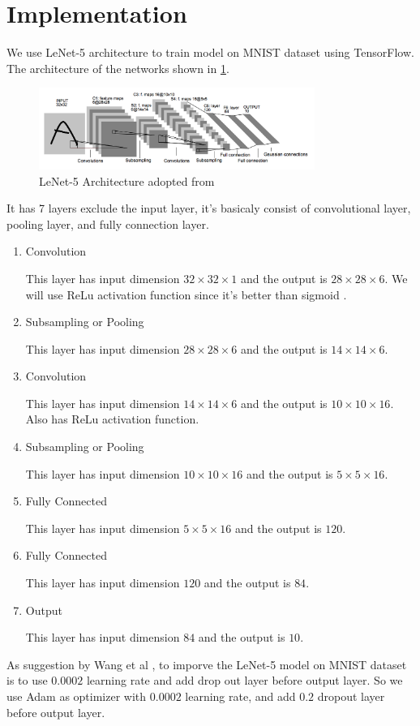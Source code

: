 \documentclass[conference]{IEEEtran}
\begin{document}
\section{Implementation}
We use LeNet-5 architecture to train model on MNIST dataset using TensorFlow. The architecture of the networks shown in \ref{fig:lenet-5archi}.
\begin{figure}[htbp]
    \centerline{\includegraphics[width=9cm]{LeNet-5Architecture.png}}
    \caption{LeNet-5 Architecture adopted from \protect\cite{lenet-5} }
    \label{fig:lenet-5archi}
\end{figure}
It has 7 layers exclude the input layer, it's basicaly consist of convolutional layer, pooling layer, and fully connection layer.
\begin{enumerate}
    \item Convolution

    This layer has input dimension $32 \times 32 \times 1$ and the output is $28 \times 28 \times 6$.
    We will use ReLu activation function since it's better than sigmoid \cite{wang2020improvement}.

    \item Subsampling or Pooling 
    
    This layer has input dimension $28 \times 28 \times 6$ and the output is $14 \times 14 \times 6$.

    \item Convolution
    
    This layer has input dimension $14 \times 14 \times 6$ and the output is $10 \times 10 \times 16$. Also has ReLu activation function.

    \item Subsampling or Pooling 
    
    This layer has input dimension $10 \times 10 \times 16$ and the output is $5 \times 5 \times 16$.

    \item Fully Connected
    
    This layer has input dimension $5 \times 5 \times 16$ and the output is $120$.

    \item Fully Connected
    
    This layer has input dimension $120$ and the output is $84$.

    \item Output  
    
    This layer has input dimension $84$ and the output is $10$.

\end{enumerate}
As suggestion by Wang et al \cite{wang2020improvement}, to imporve the LeNet-5 model on MNIST dataset is to use $0.0002$ learning rate and add drop out layer before output layer.
So we use Adam as optimizer with $0.0002$ learning rate, and add $0.2$ dropout layer before output layer.
\end{document}
